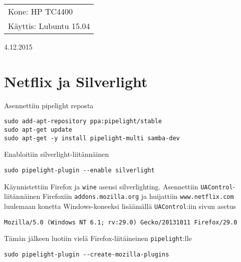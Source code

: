 \documentclass[main.tex]{subfiles}
\begin{document}
\thispagestyle{empty}
\begin{tabular}[t]{l}
Kone: HP TC4400\\
Käyttis: Lubuntu 15.04
\end{tabular}
\hfill 4.12.2015

{\section{Netflix ja Silverlight}}

Asennettiin pipelight reposta

\begin{lstlisting}
sudo add-apt-repository ppa:pipelight/stable
sudo apt-get update
sudo apt-get -y install pipelight-multi samba-dev
\end{lstlisting}

Enabloitiin silverlight-liitännäinen

\begin{lstlisting}
sudo pipelight-plugin --enable silverlight
\end{lstlisting}

Käynnistettiin Firefox ja \texttt{wine} asensi silverlighting. Asennettiin \texttt{UAControl}-liitännäinen Firefoxiin \texttt{addons.mozilla.org} ja huijattiin \texttt{www.netflix.com} luulemaan konetta Windows-koneeksi lisäämällä \texttt{UAControl}:iin sivun asetus

\begin{lstlisting}
Mozilla/5.0 (Windows NT 6.1; rv:29.0) Gecko/20131011 Firefox/29.0
\end{lstlisting}

Tämän jälkeen luotiin vielä Firefox-liitäineinen \texttt{pipelight}:lle

\begin{lstlisting}
sudo pipelight-plugin --create-mozilla-plugins
\end{lstlisting}
\end{document}
